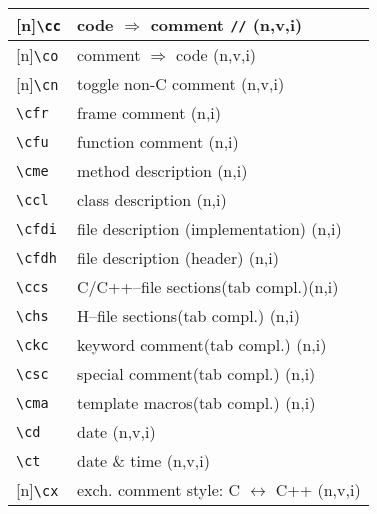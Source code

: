\documentclass[oneside,11pt,landscape,DIV16]{scrartcl}
\newcommand{\Rep}{{\tiny{[n]}}}
\begin{document}
\begin{multicols}{3}
\begin{center}
\begin{tabular}[]{|p{10mm}|p{60mm}|}
\hline \Rep\verb'\cc'  & code $\Rightarrow$ comment \verb'//'    \hfill (n,v,i)\\
\hline \Rep\verb'\co'  & comment $\Rightarrow$ code              \hfill (n,v,i)\\
\hline \Rep\verb'\cn'  & toggle non-C comment                    \hfill (n,v,i)\\
%
\hline \verb'\cfr' & frame comment                               \hfill (n,i)\\
\hline \verb'\cfu' & function comment                            \hfill (n,i)\\
\hline \verb'\cme' & method description                          \hfill (n,i)\\
\hline \verb'\ccl' & class description                           \hfill (n,i)\\
\hline \verb'\cfdi'& file description (implementation)           \hfill (n,i)\\
\hline \verb'\cfdh'& file description (header)                   \hfill (n,i)\\
%
\hline \verb'\ccs'& C/C++--file sections\hspace{3mm}\footnotesize{(tab compl.)}\hfill \normalsize{(n,i)}\\
\hline \verb'\chs'& H--file sections\hspace{10mm}\footnotesize{(tab compl.)}   \hfill \normalsize{(n,i)}\\
\hline \verb'\ckc'& keyword comment\hspace{5mm}\footnotesize{(tab compl.)}     \hfill \normalsize{(n,i)}\\
\hline \verb'\csc'& special comment\hspace{7,5mm}\footnotesize{(tab compl.)}   \hfill \normalsize{(n,i)}\\
\hline \verb'\cma'& template macros\hspace{7,5mm}\footnotesize{(tab compl.)}   \hfill \normalsize{(n,i)}\\
%
\hline \verb'\cd' & date                                                       \hfill (n,v,i)\\
\hline \verb'\ct' & date \& time                                               \hfill (n,v,i)\\
\hline \Rep\verb'\cx' & exch. comment style: C $\leftrightarrow$ C++           \hfill (n,v,i)\\
\hline 
\end{tabular}\\
%

\end{center}
\end{multicols}
\end{document}
